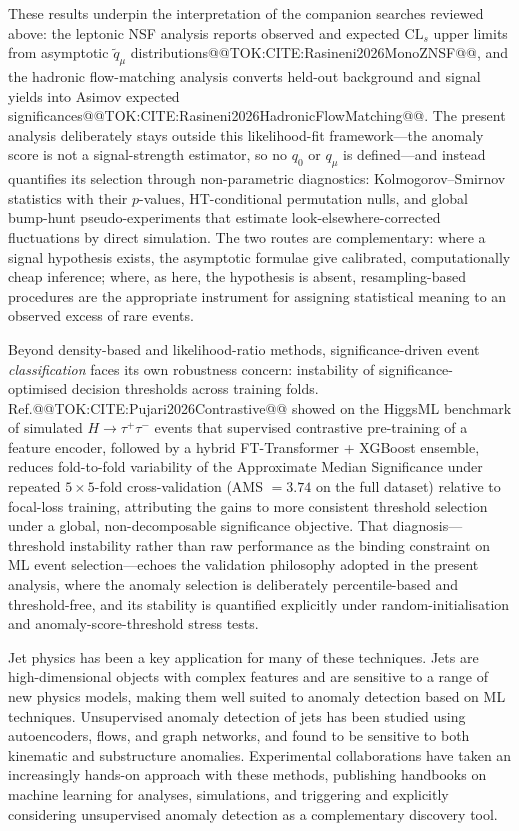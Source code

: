 \documentclass[11pt]{article}
\begin{document}
These results underpin the interpretation of the companion searches reviewed above: the leptonic NSF analysis reports observed and expected $\mathrm{CL}_{s}$ upper limits from asymptotic $\tilde{q}_\mu$ distributions@@TOK:CITE:Rasineni2026MonoZNSF@@, and the hadronic flow-matching analysis converts held-out background and signal yields into Asimov expected significances@@TOK:CITE:Rasineni2026HadronicFlowMatching@@. The present analysis deliberately stays outside this likelihood-fit framework---the anomaly score is not a signal-strength estimator, so no $q_0$ or $q_\mu$ is defined---and instead quantifies its selection through non-parametric diagnostics: Kolmogorov--Smirnov statistics with their $p$-values, HT-conditional permutation nulls, and global bump-hunt pseudo-experiments that estimate look-elsewhere-corrected fluctuations by direct simulation. The two routes are complementary: where a signal hypothesis exists, the asymptotic formulae give calibrated, computationally cheap inference; where, as here, the hypothesis is absent, resampling-based procedures are the appropriate instrument for assigning statistical meaning to an observed excess of rare events.

Beyond density-based and likelihood-ratio methods, significance-driven event \emph{classification} faces its own robustness concern: instability of significance-optimised decision thresholds across training folds. Ref.@@TOK:CITE:Pujari2026Contrastive@@ showed on the HiggsML benchmark of simulated $H\to\tau^+\tau^-$ events that supervised contrastive pre-training of a feature encoder, followed by a hybrid FT-Transformer + XGBoost ensemble, reduces fold-to-fold variability of the Approximate Median Significance under repeated $5\times5$-fold cross-validation (AMS $= 3.74$ on the full dataset) relative to focal-loss training, attributing the gains to more consistent threshold selection under a global, non-decomposable significance objective. That diagnosis---threshold instability rather than raw performance as the binding constraint on ML event selection---echoes the validation philosophy adopted in the present analysis, where the anomaly selection is deliberately percentile-based and threshold-free, and its stability is quantified explicitly under random-initialisation and anomaly-score-threshold stress tests.

Jet physics has been a key application for many of these techniques. Jets are high-dimensional objects with complex features and are sensitive to a range of new physics models, making them well suited to anomaly detection based on ML techniques. Unsupervised anomaly detection of jets has been studied using autoencoders, flows, and graph networks, and found to be sensitive to both kinematic and substructure anomalies. Experimental collaborations have taken an increasingly hands-on approach with these methods, publishing handbooks on machine learning for analyses, simulations, and triggering and explicitly considering unsupervised anomaly detection as a complementary discovery tool.
\end{document}
